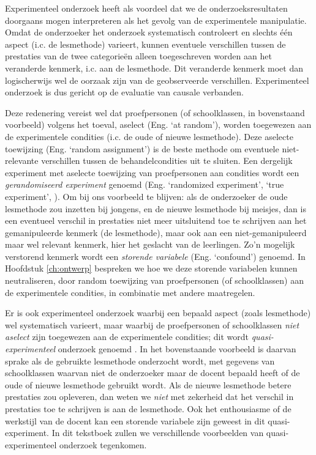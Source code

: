 \documentclass[
]{book}
\begin{document}
Experimenteel onderzoek heeft als voordeel dat we de
onderzoeksresultaten doorgaans mogen interpreteren als het gevolg van de
experimentele manipulatie. Omdat de onderzoeker het onderzoek
systematisch controleert en slechts één aspect (i.c. de lesmethode)
varieert, kunnen eventuele verschillen tussen de prestaties van de twee
categorieën alleen toegeschreven worden aan het veranderde kenmerk, i.c.
aan de lesmethode. Dit veranderde kenmerk moet dan logischerwijs wel de
oorzaak zijn van de geobserveerde verschillen. Experimenteel onderzoek
is dus gericht op de evaluatie van causale verbanden.

Deze redenering vereist wel dat proefpersonen (of schoolklassen, in
bovenstaand voorbeeld) volgens het toeval, aselect (Eng. `at random'),
worden toegewezen aan de experimentele condities (i.c. de oude of nieuwe
lesmethode). Deze aselecte toewijzing (Eng. `random assignment') is de
beste methode om eventuele niet-relevante verschillen tussen de
behandelcondities uit te sluiten. Een dergelijk experiment met aselecte
toewijzing van proefpersonen aan condities wordt een \emph{gerandomiseerd
experiment} genoemd (Eng. `randomized experiment', `true experiment', ).
Om bij ons voorbeeld te blijven: als de onderzoeker de oude lesmethode
zou inzetten bij jongens, en de nieuwe lesmethode bij meisjes, dan is
een eventueel verschil in prestaties niet meer uitsluitend toe te
schrijven aan het gemanipuleerde kenmerk (de lesmethode), maar ook aan
een niet-gemanipuleerd maar wel relevant kenmerk, hier het geslacht van
de leerlingen. Zo'n mogelijk verstorend kenmerk wordt een \emph{storende
variabele} (Eng. `confound') genoemd. In
Hoofdstuk \ref{ch:ontwerp} bespreken we hoe we deze storende variabelen
kunnen neutraliseren, door random toewijzing van proefpersonen (of
schoolklassen) aan de experimentele condities, in combinatie met andere maatregelen.

Er is ook experimenteel onderzoek waarbij een bepaald aspect (zoals
lesmethode) wel systematisch varieert, maar waarbij de proefpersonen of
schoolklassen \emph{niet aselect} zijn toegewezen aan de experimentele
condities; dit wordt \emph{quasi-experimenteel} onderzoek genoemd \citep{SCC02}.
In het bovenstaande voorbeeld is daarvan sprake als de gebruikte
lesmethode onderzocht wordt, met gegevens van schoolklassen waarvan niet
de onderzoeker maar de docent bepaald heeft of de oude of nieuwe
lesmethode gebruikt wordt. Als de nieuwe lesmethode betere prestaties
zou opleveren, dan weten we \emph{niet} met zekerheid dat het verschil in
prestaties toe te schrijven is aan de lesmethode. Ook het enthousiasme
of de werkstijl van de docent kan een storende variabele zijn geweest in dit quasi-experiment. In dit tekstboek zullen we verschillende
voorbeelden van quasi-experimenteel onderzoek tegenkomen.
\end{document}
